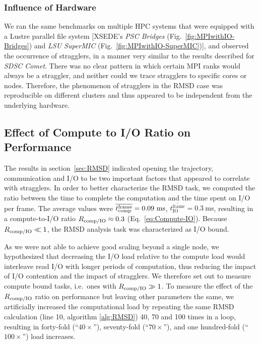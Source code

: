 \subsubsection*{Influence of Hardware}
We ran the same benchmarks on multiple HPC systems that were equipped with a Lustre parallel file system [XSEDE's \emph{PSC Bridges} (Fig.~\ref{fig:MPIwithIO-Bridges}) and \emph{LSU SuperMIC} (Fig.~\ref{fig:MPIwithIO-SuperMIC})], and observed the occurrence of stragglers, in a manner very similar to the results described for \emph{SDSC Comet}.
There was no clear pattern in which certain MPI ranks would always be a straggler, and neither could we trace stragglers to specific cores or nodes.
Therefore, the phenomenon of stragglers in the RMSD case was reproducible on different clusters and thus appeared to be independent from the underlying hardware.

\subsection{Effect of Compute to I/O Ratio on Performance}
\label{sec:bound}

The results in section~\ref{sec:RMSD} indicated opening the trajectory, communication and I/O to be two important factors that appeared to correlate with stragglers. 
In order to better characterize the RMSD task, we computed the ratio between the time to complete the computation and the time spent on I/O per frame.
The average values were $\overline{\tcomp^{\text{frame}}} = 0.09\ \text{ms}$, $\overline{t_{\text{IO}}^{\text{frame}}} = 0.3\ \text{ms}$, resulting in a compute-to-I/O ratio $R_{\text{comp/IO}} \approx 0.3$ (Eq.~\ref{eq:Compute-IO}).
Because $R_{\text{comp/IO}} \ll 1$, the RMSD analysis task was characterized as I/O bound.

As we were not able to achieve good scaling beyond a single node, we hypothesized that decreasing the I/O load relative to the compute load would interleave read I/O with longer periods of computation, thus reducing the impact of I/O contention and the impact of stragglers.
We therefore set out to measure compute bound tasks, i.e.\ ones with $R_{\text{comp/IO}} \gg 1$.
To measure the effect of the $R_{\text{comp/IO}}$ ratio on performance but leaving other parameters the same, we artificially increased the computational load by repeating the same RMSD calculation (line 10, algorithm \ref{alg:RMSD}) 40, 70 and 100 times in a loop, resulting in forty-fold (``$40\times$''), seventy-fold (``$70\times$''), and one hundred-fold (``$100\times$'') load increases.

